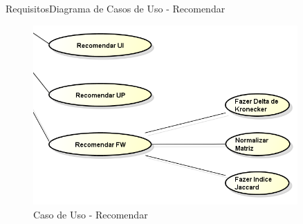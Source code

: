 \begin{frame}{Requisitos}{Diagrama de Casos de Uso - Recomendar}

\begin{figure}[ht]
    \begin{center}
    \includegraphics[width=0.9\textwidth]{img/CasosDeUso_Recomendar}
    \end{center}
\caption{Caso de Uso - Recomendar}
\end{figure}
\end{frame}